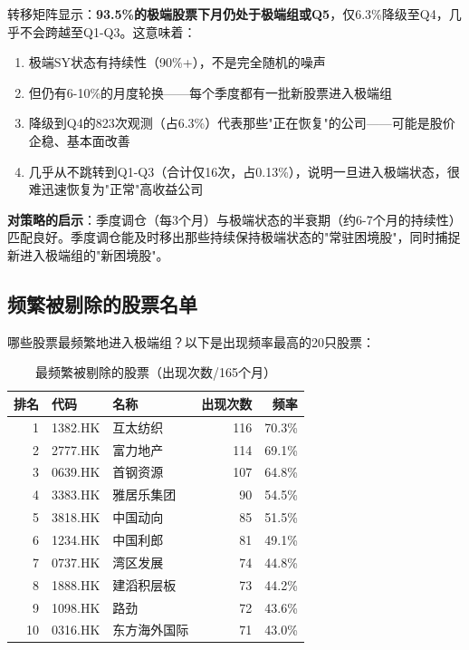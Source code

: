 \documentclass[10pt,a4paper]{ctexart}
\begin{document}
转移矩阵显示：\textbf{93.5\%的极端股票下月仍处于极端组或Q5}，仅6.3\%降级至Q4，几乎不会跨越至Q1-Q3。这意味着：

\begin{enumerate}[label=(\arabic*)]
    \item 极端SY状态有持续性（90\%+），不是完全随机的噪声
    \item 但仍有6-10\%的月度轮换——每个季度都有一批新股票进入极端组
    \item 降级到Q4的823次观测（占6.3\%）代表那些"正在恢复"的公司——可能是股价企稳、基本面改善
    \item 几乎从不跳转到Q1-Q3（合计仅16次，占0.13\%），说明一旦进入极端状态，很难迅速恢复为"正常"高收益公司
\end{enumerate}

\textbf{对策略的启示}：季度调仓（每3个月）与极端状态的半衰期（约6-7个月的持续性）匹配良好。季度调仓能及时移出那些持续保持极端状态的"常驻困境股"，同时捕捉新进入极端组的"新困境股"。

\subsection{频繁被剔除的股票名单}

哪些股票最频繁地进入极端组？以下是出现频率最高的20只股票：

\begin{table}[htbp]
\centering
\caption{最频繁被剔除的股票（出现次数/165个月）}
\begin{tabular}{rllrr}
\toprule
\textbf{排名} & \textbf{代码} & \textbf{名称} & \textbf{出现次数} & \textbf{频率} \\
\midrule
1 & 1382.HK & 互太纺织 & 116 & 70.3\% \\
2 & 2777.HK & 富力地产 & 114 & 69.1\% \\
3 & 0639.HK & 首钢资源 & 107 & 64.8\% \\
4 & 3383.HK & 雅居乐集团 & 90 & 54.5\% \\
5 & 3818.HK & 中国动向 & 85 & 51.5\% \\
6 & 1234.HK & 中国利郎 & 81 & 49.1\% \\
7 & 0737.HK & 湾区发展 & 74 & 44.8\% \\
8 & 1888.HK & 建滔积层板 & 73 & 44.2\% \\
9 & 1098.HK & 路劲 & 72 & 43.6\% \\
10 & 0316.HK & 东方海外国际 & 71 & 43.0\% \\
\bottomrule
\end{tabular}
\end{table}
\end{document}

